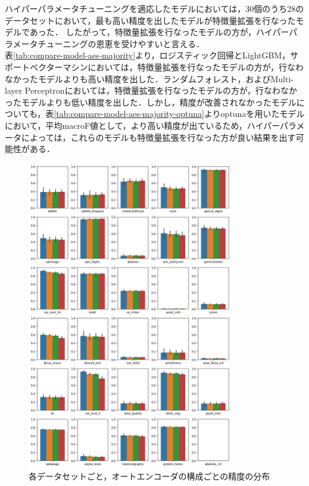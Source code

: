 ハイパーパラメータチューニングを適応したモデルにおいては，30個のうち28のデータセットにおいて，最も高い精度を出したモデルが特徴量拡張を行なったモデルであった．
したがって，特徴量拡張を行なったモデルの方が，ハイパーパラメータチューニングの恩恵を受けやすいと言える．\\

表\ref{tab:compare-model-aes-majority}より，ロジスティック回帰とLightGBM，サポートベクターマシンにおいては，特徴量拡張を行なったモデルの方が，行なわなかったモデルよりも高い精度を出した．ランダムフォレスト，およびMulti-layer Perceptronにおいては，特徴量拡張を行なったモデルの方が，行なわなかったモデルよりも低い精度を出した．しかし，精度が改善されなかったモデルについても，表\ref{tab:compare-model-aes-majority-optuna}よりoptunaを用いたモデルにおいて，平均macroF値として，より高い精度が出ているため，ハイパーパラメータによっては，これらのモデルも特徴量拡張を行なった方が良い結果を出す可能性がある．\\


\begin{figure}
    \centering
    \includegraphics[width=0.8\textwidth]{figures/result-dataset.png}
    \caption{各データセットごと，オートエンコーダの構成ごとの精度の分布}
    \label{fig:compare-dataset}
\end{figure}

